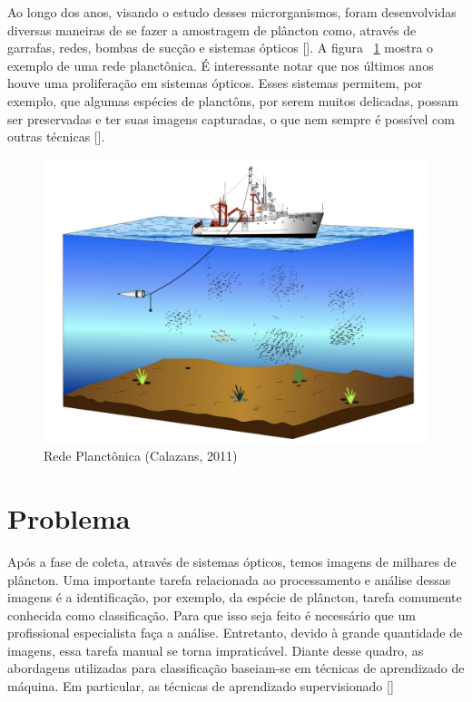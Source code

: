 Ao longo dos anos, visando o estudo desses microrganismos, foram desenvolvidas diversas maneiras de se fazer a amostragem de plâncton como, através de garrafas, redes, bombas de sucção e sistemas ópticos [\cite{calazans2011organismos}]. A figura ~\ref{fig:amostragem_planctons} mostra o exemplo de uma rede planctônica. É interessante notar que nos últimos anos houve uma proliferação em sistemas ópticos. Esses sistemas permitem, por exemplo, que algumas espécies de planctôns, por serem muitos delicadas, possam ser preservadas e ter suas imagens capturadas, o que nem sempre é possível com outras técnicas [\cite{benfield2007rapid}].


\begin{figure}
  \centering
  \includegraphics[width=.8\textwidth]{figures/amostragem_planctons.png}
  \caption{Rede Planctônica (Calazans, 2011)}
  \label{fig:amostragem_planctons}
\end{figure}


\section{Problema}
\label{sec:intro_problema}

Após a fase de coleta, através de sistemas ópticos, temos imagens de milhares de plâncton. Uma importante tarefa relacionada ao processamento e análise dessas imagens é a identificação, por exemplo, da espécie de plâncton, tarefa comumente conhecida como classificação. Para que isso seja feito é necessário que um profissional especialista faça a análise. Entretanto, devido à grande quantidade de imagens, essa tarefa manual se torna impraticável. Diante desse quadro, as abordagens utilizadas para classificação baseiam-se em técnicas de aprendizado de máquina. Em particular, as técnicas de aprendizado supervisionado [\cite{jeffries1980computer, jeffries1984automated, berman1990image, tang1998automatic, luo2003learning, davis2004real, grosjean2004enumeration, luo2005active, hu2005automatic, blaschko2005automatic, hu2006accurate, sosik2007automated, bell2008assessment, soh2008segmentation, al2016plankton, luo2017automated, al2018intelligent}]


